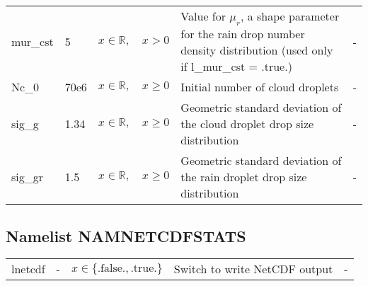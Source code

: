 \documentclass[twoside,11pt,fleqn,a4paper,english,openright]{report}
\begin{document}
\begin{center}
\begin{supertabular}{|l|p{1.6cm}|p{4cm}|p{6cm}|l|}
  mur\_cst	& 5			& $x \in \mathbb{R}, \quad x>0$	& Value for $\mu_r$, a shape parameter for the rain drop number density distribution (used only if l\_mur\_cst = .true.)	& -\\
  Nc\_0		& 70e6			& $x \in \mathbb{R}, \quad x \ge 0$	& Initial number of cloud droplets			& -\\
  sig\_g	& 1.34			& $x \in \mathbb{R}, \quad x \ge 0$	& Geometric standard deviation of the cloud droplet drop size distribution			& -\\
  sig\_gr	& 1.5		& $x \in \mathbb{R}, \quad x \ge 0$	& Geometric standard deviation of the rain droplet drop size distribution			& -\\
\end{supertabular}
\end{center}

\subsection{Namelist NAMNETCDFSTATS}\label{par:netcdf}
\begin{center}
  \tablelasttail{
        &&&&\\\hline
  }
\begin{supertabular}{|l|p{1.6cm}|p{4cm}|p{6cm}|l|}
lnetcdf	& -	& $x\in\{\text{.false.},\text{.true.}\}$	& Switch to write NetCDF output	& -\\
\end{supertabular}
\end{center}

\newpage
\end{document}
